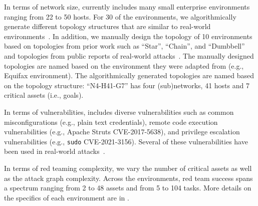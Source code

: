 In terms of network size,  \benchmark
currently includes many  small enterprise environments ranging from 22 to 50 hosts.
For 30 of the environments, we algorithmically generate different topology structures that are similar to real-world environments~\cite{ciscoEnterpriseNetwork, ibmTreeNetwork}.
In addition, we manually design the topology of 10 environments based on topologies from prior work such as ``Star'', ``Chain'', and ``Dumbbell''~\cite{mirage, ringNetwork2013technique, ferguson2021_deception_psychology, ciscoEnterpriseNetwork, dumbbellNetwork} and topologies from public reports of real-world attacks~\cite{equifax_report, colonial_pipeline_techtarget}.
The manually designed topologies are named based on the environment they were adapted from (e.g., Equifax environment). The   algorithmically generated topologies are named based on the topology structure: ``N4-H41-G7'' has four (sub)networks, 41 hosts and 7 critical assets (i.e., goals).

In terms of vulnerabilities, \benchmark includes diverse vulnerabilities such as common misconfigurations (e.g., plain text credentials), remote code execution vulnerabilities (e.g., Apache Struts CVE-2017-5638), and privilege escalation vulnerabilities (e.g., \texttt{sudo} CVE-2021-3156).
Several of these vulnerabilities have been used in real-world attacks~\cite{equifax_ftc_settlment, colonial_pipeline_techtarget}.

In terms of red teaming complexity,   we vary the number of critical assets as well as the attack graph complexity. Across the environments, red team success  spans  a spectrum ranging  from  2 to 48 assets and from 5 to 104 tasks.
More details on the specifics of each environment are in .
